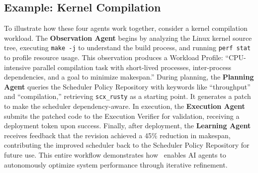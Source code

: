 \subsection{Example: Kernel Compilation}

To illustrate how these four agents work together, consider a kernel compilation workload. The \textbf{Observation Agent} begins by analyzing the Linux kernel source tree, executing \texttt{make -j} to understand the build process, and running \texttt{perf stat} to profile resource usage. This observation produces a Workload Profile: ``CPU-intensive parallel compilation task with short-lived processes, inter-process dependencies, and a goal to minimize makespan.'' During planning, the \textbf{Planning Agent} queries the Scheduler Policy Repository with keywords like ``throughput'' and ``compilation,'' retrieving \texttt{scx\_rusty} as a starting point. It generates a patch to make the scheduler dependency-aware. In execution, the \textbf{Execution Agent} submits the patched code to the Execution Verifier for validation, receiving a deployment token upon success. Finally, after deployment, the \textbf{Learning Agent} receives feedback that the revision achieved a 45\% reduction in makespan, contributing the improved scheduler back to the Scheduler Policy Repository for future use. This entire workflow demonstrates how \agent\ enables AI agents to autonomously optimize system performance through iterative refinement.


